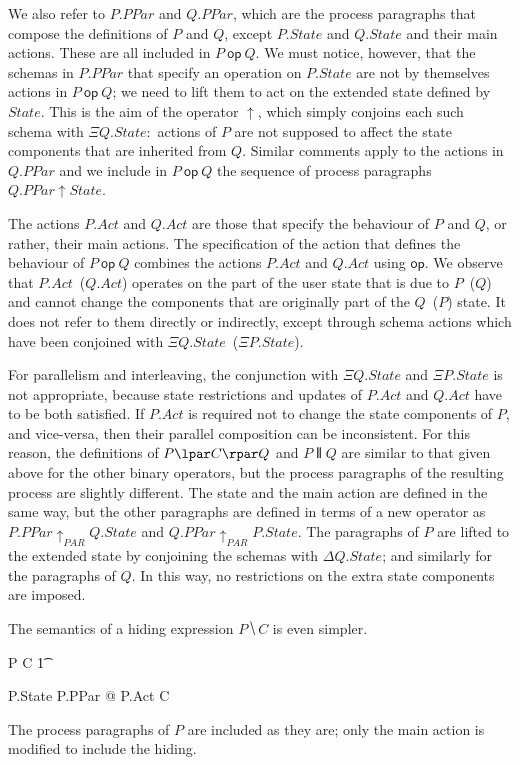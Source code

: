 \documentclass{article}
\begin{document}
We also refer to $P.PPar$ and $Q.PPar$, which are the process
paragraphs that compose the definitions of $P$ and $Q$, except
$P.State$ and $Q.State$ and their main actions.  These are all
included in $P\ \mathsf{op}\ Q$.  We must notice, however, that the
schemas in $P.PPar$ that specify an operation on $P.State$ are not by
themselves actions in $P\ \mathsf{op}\ Q$; we need to lift them to act
on the extended state defined by $State$.  This is the aim of the
operator $\uparrow$, which simply conjoins each such schema with $\Xi
Q.State$:~actions of $P$ are not supposed to affect the state
components that are inherited from $Q$.  Similar comments apply to the
actions in $Q.PPar$ and we include in $P\ \mathsf{op}\ Q$ the sequence
of process paragraphs $Q.PPar \uparrow State$.

The actions $P.Act$ and $Q.Act$ are those that specify the behaviour
of $P$ and $Q$, or rather, their main actions.  The specification of
the action that defines the behaviour of $P\ \mathsf{op}\ Q$ combines
the actions $P.Act$ and $Q.Act$ using $\mathsf{op}$.  We observe that
$P.Act$~($Q.Act$) operates on the part of the user state that is due
to $P$~($Q$) and cannot change the components that are originally part
of the $Q$~($P$) state.  It does not refer to them directly or
indirectly, except through schema actions which have been conjoined
with $\Xi Q.State$~($\Xi P.State$).

For parallelism and interleaving, the conjunction with $\Xi Q.State$
and $\Xi P.State$ is not appropriate, because state restrictions and
updates of $P.Act$ and $Q.Act$ have to be both satisfied.  If $P.Act$
is required not to change the state components of $P$, and vice-versa,
then their parallel composition can be inconsistent.  For this reason,
the definitions of $P \lpar C\rpar Q$ and $P \interleave Q$ are
similar to that given above for the other binary operators, but the
process paragraphs of the resulting process are slightly different.
The state and the main action are defined in the same way, but the
other paragraphs are defined in terms of a new operator as $P.PPar
\uparrow_{PAR} Q.State$ and $Q.PPar \uparrow_{PAR} P.State$.  The
paragraphs of $P$ are lifted to the extended state by conjoining the
schemas with $\Delta Q.State$; and similarly for the paragraphs of
$Q$.  In this way, no restrictions on the extra state components are
imposed.

The semantics of a hiding expression $P \hide C$ is even simpler.
\begin{zed}
  P \hide C  \circbegin
  \also %
  \t1
  \begin{block}
    P.State
    \also %
    P.PPar
    \also %
    @ P.Act \hide C
  \end{block}
  \also %
  \circend
\end{zed}
The process paragraphs of $P$ are included as they are; only the main
action is modified to include the hiding.
\end{document}
